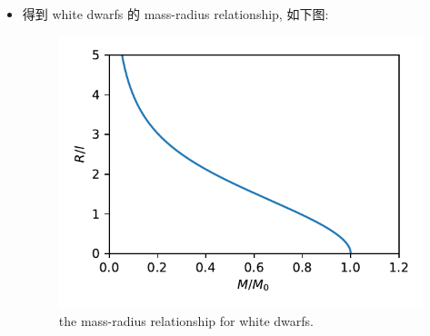 \begin{itemize}
	\item 得到 white dwarfs 的 mass-radius relationship, 如下图:
	\begin{figure}[H]
		\centering
		\includegraphics[scale=1]{figures/the mass-radius relationship for white dwarfs.pdf}
		\caption{the mass-radius relationship for white dwarfs.}
	\end{figure}
\end{itemize}
